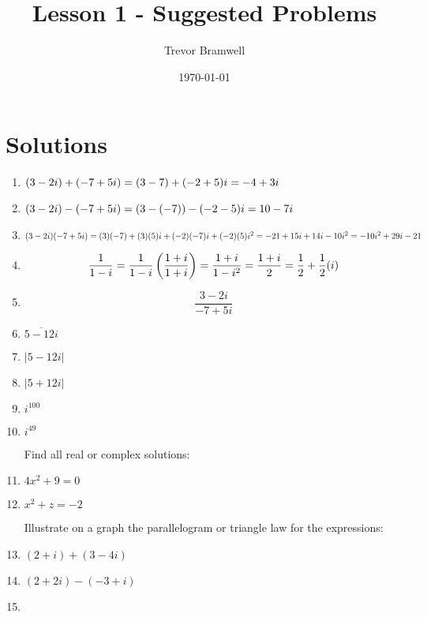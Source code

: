 \documentclass[12pt]{article}
\title{Lesson 1 - Suggested Problems}
\author{
    Trevor Bramwell \\
}
\date{\today}
\begin{document}
\maketitle

\section*{Solutions}
\begin{enumerate}
\item $
    (3-2i)+(-7+5i) = (3-7)+(-2+5)i \\
    = -4+3i
$
\item $
    (3-2i)-(-7+5i) = (3-(-7))-(-2-5)i \\
    = 10-7i
$
\item $
    (3-2i)(-7+5i) = (3)(-7)+(3)(5)i+(-2)(-7)i+(-2)(5)i^2 \\
    = -21+15i+14i-10i^2 \\
    = -10i^2+29i-21
$
\item \[
    \frac{1}{1-i} = \frac{1}{1-i}\left(\frac{1+i}{1+i}\right)
    = \frac{1+i}{1-i^2}
    = \frac{1+i}{2} \\
    = \frac{1}{2}+\frac{1}{2}(i)
\]
\item \[ \frac{3-2i}{-7+5i} \]
\item $ \overline{5-12i} $
\item $ |5-12i| $
\item $ |5+12i| $
\item $ i^{100} $
\item $ i^{49} $

Find all real or complex solutions:
\item $ 4x^2+9=0 $
\item $ x^2+z=-2 $

Illustrate on a graph the parallelogram or triangle law for the expressions:
\item $ (2+i)+(3-4i) $
\item $ (2+2i)-(-3+i) $
\item {}

\end{enumerate}
\end{document}
